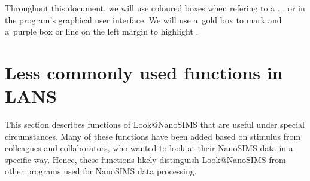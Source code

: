 \documentclass[a4paper, 11pt]{article}
\newcounter{step}
\begin{document}
\vskip3mm
Throughout this document, we will use coloured boxes when refering to a , ,  or  in the program's graphical user interface. We will use a~gold box to mark  and a~purple box or line on the left margin to highlight .
\tcbe

\cleardoublepage{}
\tableofcontents

\clearpage


\clearpage
\clearpage
\clearpage
\clearpage
\clearpage
\clearpage

\clearpage
\section{Less commonly used functions in LANS}
\label{sec:level3}

\purplebox{}
This section describes functions of Look@NanoSIMS that are useful under special circumstances. Many of these functions have been added based on stimulus from colleagues and collaborators, who wanted to look at their NanoSIMS data in a specific way. Hence, these functions likely distinguish Look@NanoSIMS from other programs used for NanoSIMS data processing.
\tcbe

\clearpage	%
\clearpage %
\clearpage %
\clearpage %

\clearpage %
\end{document}
